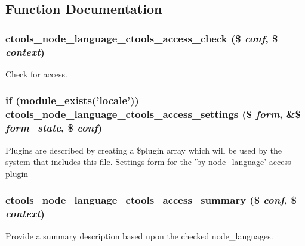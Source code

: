 \subsection{Function Documentation}
\hypertarget{node__language_8inc_ac27ae2da8cbcc5a977b533f3df2c5784}{
\subsubsection[{ctools\_\-node\_\-language\_\-ctools\_\-access\_\-check}]{\setlength{\rightskip}{0pt plus 5cm}ctools\_\-node\_\-language\_\-ctools\_\-access\_\-check (\$ {\em conf}, \/  \$ {\em context})}}
\label{node__language_8inc_ac27ae2da8cbcc5a977b533f3df2c5784}
Check for access. \hypertarget{node__language_8inc_a9fe69e37bf8d309bcf412074e74e6da1}{
\subsubsection[{ctools\_\-node\_\-language\_\-ctools\_\-access\_\-settings}]{\setlength{\rightskip}{0pt plus 5cm}if (module\_\-exists('locale')) ctools\_\-node\_\-language\_\-ctools\_\-access\_\-settings (\$ {\em form}, \/  \&\$ {\em form\_\-state}, \/  \$ {\em conf})}}
\label{node__language_8inc_a9fe69e37bf8d309bcf412074e74e6da1}
Plugins are described by creating a \$plugin array which will be used by the system that includes this file. Settings form for the 'by node\_\-language' access plugin \hypertarget{node__language_8inc_a07fd33a1e182bf2c785552f590591c30}{
\subsubsection[{ctools\_\-node\_\-language\_\-ctools\_\-access\_\-summary}]{\setlength{\rightskip}{0pt plus 5cm}ctools\_\-node\_\-language\_\-ctools\_\-access\_\-summary (\$ {\em conf}, \/  \$ {\em context})}}
\label{node__language_8inc_a07fd33a1e182bf2c785552f590591c30}
Provide a summary description based upon the checked node\_\-languages. 